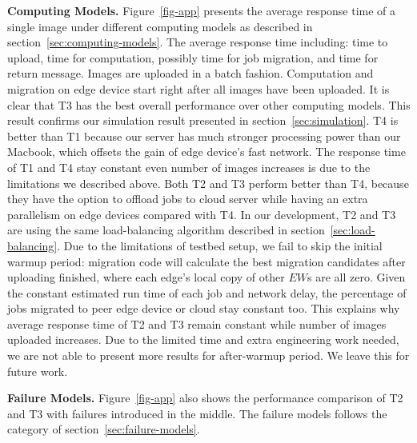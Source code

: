 

\hfill\break
\noindent \textbf{Computing Models.}
Figure~\ref{fig-app} presents the average response time of a single image under different
computing models as described in section~\ref{sec:computing-models}. The average response time including: time to upload,
time for computation, possibly time for job migration, and time for return message.
Images are uploaded in a batch fashion. Computation and migration on edge device start
right after all images have been uploaded. It is clear that T3 has the best overall performance
over other computing models. This result confirms our simulation result presented in section~\ref{sec:simulation}.
T4 is better than T1 because our server has much stronger processing power than our Macbook,
which offsets the gain of edge device's fast network.
The response time of T1 and T4 stay constant even number of images increases is due to the
limitations we described above. Both T2 and T3 perform better than T4, because they have the option to
offload jobs to cloud server while having an extra parallelism on edge devices compared with T4.
In our development, T2 and T3 are using the same load-balancing algorithm described
in section~\ref{sec:load-balancing}. Due to the limitations of testbed setup, we fail to skip the
initial warmup period: migration code will calculate the best migration candidates after uploading finished,
where each edge's local copy of other \(EW\)s are all zero. Given the constant estimated run time of each job and network delay,
the percentage of jobs migrated to peer edge device or cloud stay constant too.
This explains why average response time of T2 and T3 remain constant while number of images uploaded increases.
Due to the limited time and extra engineering work needed, we are not able to present more results for after-warmup period.
We leave this for future work.

\hfill\break
\noindent \textbf{Failure Models.}
Figure~\ref{fig-app} also shows the performance comparison of T2 and T3 with failures introduced
in the middle. The failure models follows the category of section~\ref{sec:failure-models}.
